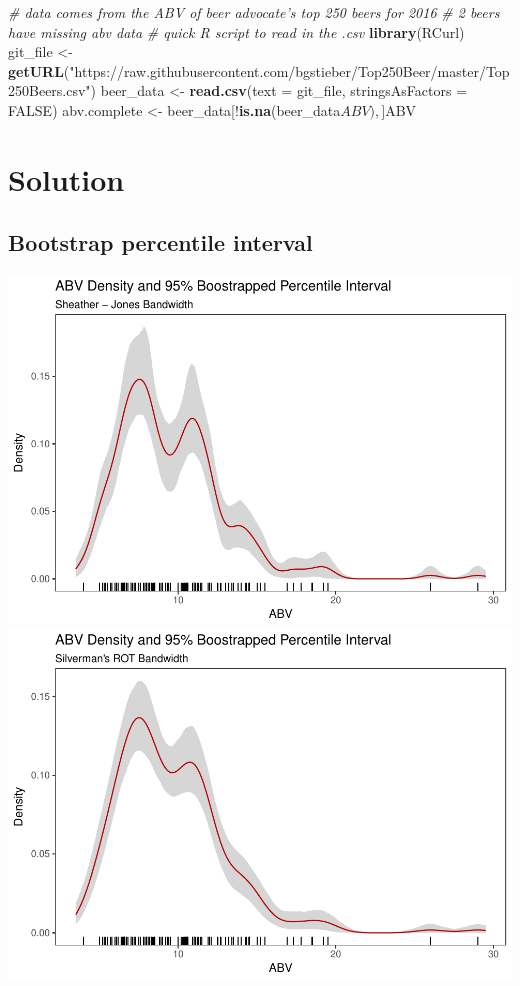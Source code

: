 \documentclass[]{article}
\newenvironment{Shaded}{\begin{snugshade}}{\end{snugshade}}
\newcommand{\KeywordTok}[1]{\textcolor[rgb]{0.13,0.29,0.53}{\textbf{{#1}}}}
\newcommand{\DataTypeTok}[1]{\textcolor[rgb]{0.13,0.29,0.53}{{#1}}}
\newcommand{\StringTok}[1]{\textcolor[rgb]{0.31,0.60,0.02}{{#1}}}
\newcommand{\CommentTok}[1]{\textcolor[rgb]{0.56,0.35,0.01}{\textit{{#1}}}}
\newcommand{\OtherTok}[1]{\textcolor[rgb]{0.56,0.35,0.01}{{#1}}}
\newcommand{\NormalTok}[1]{{#1}}
\begin{document}
\begin{Shaded}
\begin{Highlighting}[]
\CommentTok{# data comes from the ABV of beer advocate's top 250 beers for 2016}
\CommentTok{# 2 beers have missing abv data}
\CommentTok{# quick R script to read in the .csv}
\KeywordTok{library}\NormalTok{(RCurl)}
\NormalTok{git_file <-}\StringTok{ }
\KeywordTok{getURL}\NormalTok{(}\StringTok{"https://raw.githubusercontent.com/bgstieber/Top250Beer/master/Top250Beers.csv"}\NormalTok{)}
\NormalTok{beer_data <-}\StringTok{ }\KeywordTok{read.csv}\NormalTok{(}\DataTypeTok{text =} \NormalTok{git_file, }\DataTypeTok{stringsAsFactors =} \OtherTok{FALSE}\NormalTok{)}
\NormalTok{abv.complete <-}\StringTok{ }\NormalTok{beer_data[!}\KeywordTok{is.na}\NormalTok{(beer_data$ABV), ]$ABV}
\end{Highlighting}
\end{Shaded}

\section{Solution}\label{solution}

\subsection{Bootstrap percentile
interval}\label{bootstrap-percentile-interval}

\includegraphics{FinalReport_files/figure-latex/unnamed-chunk-13-1.pdf}
\includegraphics{FinalReport_files/figure-latex/unnamed-chunk-13-2.pdf}
\end{document}
